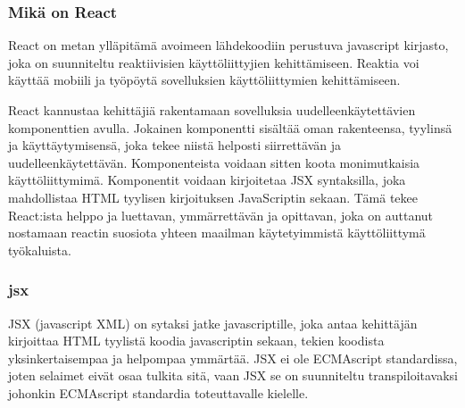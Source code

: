 

\subsubsection{Mikä on React}



React on metan ylläpitämä avoimeen lähdekoodiin perustuva javascript kirjasto, joka on suunniteltu reaktiivisien käyttöliittyjien kehittämiseen.
%
Reaktia voi käyttää mobiili ja työpöytä sovelluksien käyttöliittymien kehittämiseen. 
\medskip







%

React kannustaa kehittäjiä rakentamaan sovelluksia uudelleenkäytettävien komponenttien avulla.
Jokainen komponentti sisältää oman rakenteensa, tyylinsä ja käyttäytymisensä, joka tekee niistä helposti siirrettävän ja uudelleenkäytettävän.
Komponenteista voidaan sitten koota monimutkaisia käyttöliittymimä. 
Komponentit voidaan kirjoitetaa JSX syntaksilla, joka mahdollistaa HTML tyylisen kirjoituksen JavaScriptin sekaan.
Tämä tekee React:ista helppo ja luettavan, ymmärrettävän ja opittavan, joka on auttanut nostamaan reactin suosiota yhteen maailman käytetyimmistä käyttöliittymä työkaluista.
\medskip








\subsubsection{jsx}





JSX (javascript XML) on sytaksi jatke javascriptille, joka antaa kehittäjän kirjoittaa HTML tyylistä koodia javascriptin sekaan, tekien koodista yksinkertaisempaa ja helpompaa ymmärtää.
JSX ei ole ECMAscript standardissa, joten selaimet eivät osaa tulkita sitä, vaan JSX se on suunniteltu transpiloitavaksi johonkin ECMAscript standardia toteuttavalle kielelle.
\medskip


